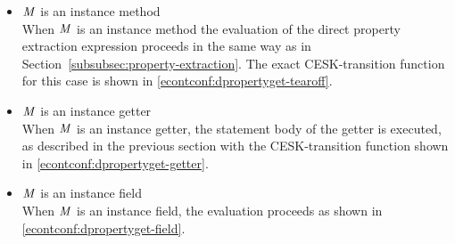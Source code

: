\documentclass[a4paper,oneside,fleqn]{article}
\begin{document}
\begin{itemize}
    \item $\mathit{M}$ is an instance method\\
        When $\mathit{M}$ is an instance method the evaluation of the direct property extraction expression proceeds in the same way as in Section~\ref{subsubsec:property-extraction}.
        The exact CESK-transition function for this case is shown in \eqref{econtconf:dpropertyget-tearoff}.

    \item $\mathit{M}$ is an instance getter\\
        When $\mathit{M}$ is an instance getter, the statement body of the getter is executed, as described in the previous section with the CESK-transition function shown in \eqref{econtconf:dpropertyget-getter}.

    \item $\mathit{M}$ is an instance field\\
        When $\mathit{M}$ is an instance field, the evaluation proceeds as shown in \eqref{econtconf:dpropertyget-field}.

\end{itemize}
\end{document}
